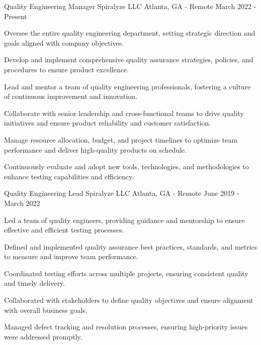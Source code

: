 

\begin{cventries}

  \cventry
    {Quality Engineering Manager} %
    {Spiralyze LLC} %
    {Atlanta, GA - Remote} %
    {March 2022 - Present} %
    {
      \begin{cvitems} %
        \item {Oversee the entire quality engineering department, setting strategic direction and goals aligned with company objectives.}
        \item {Develop and implement comprehensive quality assurance strategies, policies, and procedures to ensure product excellence.}
        \item {Lead and mentor a team of quality engineering professionals, fostering a culture of continuous improvement and innovation.}
        \item {Collaborate with senior leadership and cross-functional teams to drive quality initiatives and ensure product reliability and customer satisfaction.}
        \item {Manage resource allocation, budget, and project timelines to optimize team performance and deliver high-quality products on schedule.}
        \item {Continuously evaluate and adopt new tools, technologies, and methodologies to enhance testing capabilities and efficiency.}
      \end{cvitems}
    }

  \cventry
    {Quality Engineering Lead} %
    {Spiralyze LLC} %
    {Atlanta, GA - Remote} %
    {June 2019 - March 2022} %
    {
      \begin{cvitems} %
        \item {Led a team of quality engineers, providing guidance and mentorship to ensure effective and efficient testing processes.}
        \item {Defined and implemented quality assurance best practices, standards, and metrics to measure and improve team performance.}
        \item {Coordinated testing efforts across multiple projects, ensuring consistent quality and timely delivery.}
        \item {Collaborated with stakeholders to define quality objectives and ensure alignment with overall business goals.}
        \item {Managed defect tracking and resolution processes, ensuring high-priority issues were addressed promptly.}
      \end{cvitems}
    }


\end{cventries}

